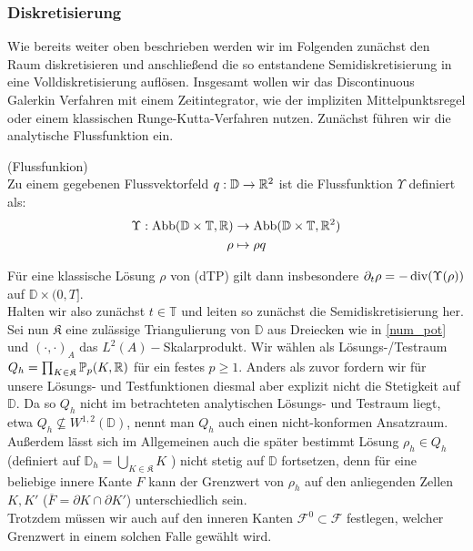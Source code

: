 \subsubsection{Diskretisierung}
Wie bereits weiter oben beschrieben werden wir im Folgenden zunächst den Raum diskretisieren und anschließend die so entstandene Semidiskretisierung in eine Volldiskretisierung auflösen. Insgesamt wollen wir das Discontinuous Galerkin Verfahren mit einem Zeitintegrator, wie der impliziten Mittelpunktsregel oder einem klassischen Runge-Kutta-Verfahren nutzen. Zunächst führen wir die analytische Flussfunktion ein. 
\begin{Definition}(Flussfunkion) \\
	\label{Flussfunktion}
	Zu einem gegebenen Flussvektorfeld $ q : \mathbb{D} \to \mathbb{R}^2 $ ist die Flussfunktion $ \Upsilon$ definiert als:\\
	\begin{align*}
		 \Upsilon : \text{Abb}(\mathbb{D}\times\mathbb{T},\mathbb{R}) &\to \text{Abb}(\mathbb{D}\times\mathbb{T},\mathbb{R}^2) \\
		 \rho &\mapsto \rho q
	\end{align*}
\end{Definition}
Für eine klassische Lösung $ \rho  $ von (dTP) gilt dann insbesondere $ \partial_t \rho = - \operatorname{div} (\Upsilon(\rho)) $ auf $ \mathbb{D} \times (0,T] $.	\\
Halten wir also zunächst $ t \in \mathbb{T} $ und leiten so zunächst die Semidiskretisierung her.\\
Sei nun $ \mathfrak{K} $ eine zulässige Triangulierung von $ \mathbb{D} $ aus Dreiecken wie in \ref{num_pot} und $ (\cdot , \cdot)_A $ das $ L^2(A)-$Skalarprodukt.
Wir wählen als Lösungs-/Testraum $Q_h = \prod_{K \in \mathfrak{K}} \mathbb{P}_p(K,\mathbb{R}) $ für ein festes $p \geq 1 $. Anders als zuvor fordern wir für unsere Lösungs- und Testfunktionen diesmal aber explizit nicht die Stetigkeit auf $\mathbb{D}$. Da so $Q_h$ nicht im betrachteten analytischen Lösungs- und Testraum liegt, etwa  $Q_h \nsubseteq W^{1,2}(\mathbb{D})$, nennt man $Q_h$ auch einen nicht-konformen Ansatzraum.
Außerdem lässt sich im Allgemeinen auch die später bestimmt Lösung $ \rho_h \in Q_h $ (definiert auf $\mathbb{D}_h = \bigcup_{K \in \mathfrak{K}} K$ ) nicht stetig auf $ \mathbb{D} $ fortsetzen, denn für eine beliebige innere Kante $ F $ kann der Grenzwert von $ \rho_h $ auf den anliegenden Zellen $ K,K' $ ($ \overline{F} = \partial K \cap \partial K' $) unterschiedlich sein. \\
Trotzdem müssen wir auch auf den inneren Kanten $ \mathcal{F}^0 \subset \mathcal{F} $ festlegen, welcher Grenzwert in einem solchen Falle gewählt wird. \\
